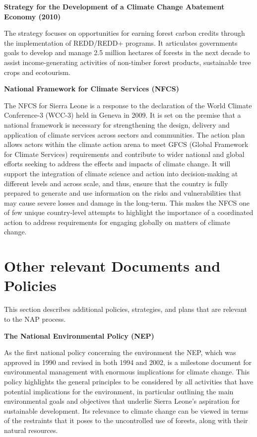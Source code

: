 \documentclass[
]{book}
\begin{document}
\textbf{Strategy for the Development of a Climate Change Abatement Economy (2010)}

The strategy focuses on opportunities for earning forest carbon credits through the implementation of REDD/REDD+ programs. It articulates governments goals to develop and manage 2.5 million hectares of forests in the next decade to assist income-generating activities of non-timber forest products, sustainable tree crops and ecotourism.

\textbf{National Framework for Climate Services (NFCS)}

The NFCS for Sierra Leone is a response to the declaration of the World Climate Conference-3 (WCC-3) held in Geneva in 2009. It is set on the premise that a national framework is necessary for strengthening the design, delivery and application of climate services across sectors and communities. The action plan allows actors within the climate action arena to meet GFCS (Global Framework for Climate Services) requirements and contribute to wider national and global efforts seeking to address the effects and impacts of climate change. It will support the integration of climate science and action into decision-making at different levels and across scale, and thus, ensure that the country is fully prepared to generate and use information on the risks and vulnerabilities that may cause severe losses and damage in the long-term. This makes the NFCS one of few unique country-level attempts to highlight the importance of a coordinated action to address requirements for engaging globally on matters of climate change.

\hypertarget{other-relevant-documents-and-policies}{%
\section{Other relevant Documents and Policies}\label{other-relevant-documents-and-policies}}

This section describes additional policies, strategies, and plans that are relevant to the NAP process.

\textbf{The National Environmental Policy (NEP)}

As the first national policy concerning the environment the NEP, which was approved in 1990 and revised in both 1994 and 2002, is a milestone document for environmental management with enormous implications for climate change. This policy highlights the general principles to be considered by all activities that have potential implications for the environment, in particular outlining the main environmental goals and objectives that underlie Sierra Leone's aspiration for sustainable development. Its relevance to climate change can be viewed in terms of the restraints that it poses to the uncontrolled use of forests, along with their natural resources.
\end{document}
